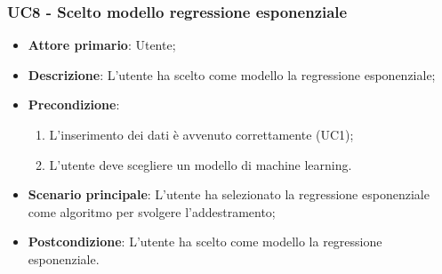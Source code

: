\subsubsection{UC8 - Scelto modello regressione esponenziale}
\label{sssec:uc8}
\begin{itemize}
  \item \textbf{Attore primario}: Utente;
  \item \textbf{Descrizione}: L'utente ha scelto come modello la regressione esponenziale;
  \item \textbf{Precondizione}:
  \begin{enumerate}
    \item L'inserimento dei dati è avvenuto correttamente (UC1);
    \item L'utente deve scegliere un modello di machine learning.
  \end{enumerate}
  \item \textbf{Scenario principale}: L'utente ha selezionato la regressione esponenziale come algoritmo per svolgere l'addestramento;
  \item \textbf{Postcondizione}: L'utente ha scelto come modello la regressione esponenziale.
\end{itemize}
